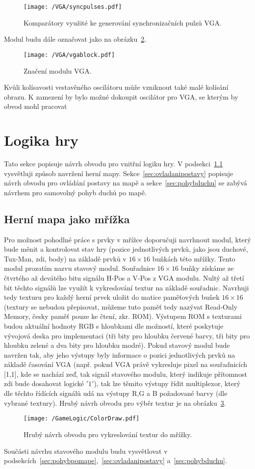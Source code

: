 \documentclass{report}
\begin{document}
\begin{figure}
\centering
\texttt{[image: /VGA/syncpulses.pdf]}
\caption{Komparátory využité ke generování synchronizačních pulzů VGA.}
\label{fig:syncpulses}
\end{figure}
Modul budu dále označovat jako na obrázku~\ref{fig:vgablock}.
\begin{figure}
\centering
\texttt{[image: /VGA/vgablock.pdf]}
\caption{Značení modulu VGA.}
\label{fig:vgablock}
\end{figure}
\par Kvůli kolísavosti vestavěného oscilátoru může vzniknout také malé kolísání obrazu. K zamezení by bylo možné dokoupit oscilátor pro VGA, se kterým by obvod mohl pracovat
\section{Logika hry}\label{sec:logikahry}
Tato sekce popisuje návrh obvodu pro vnitřní logiku hry. V podsekci~\ref{sec:mapajakomrizka} vysvětluji způsob navržení herní mapy. Sekce~\ref{sec:ovladanipostavy} popisuje návrh obvodu pro ovládání postavy na mapě a  sekce~\ref{sec:pohybduchu} se zabývá návrhem pro samovolný pohyb duchů po mapě.
\subsection{Herní mapa jako mřížka}\label{sec:mapajakomrizka}
Pro možnost pohodlné práce s prvky v mřížce doporučuji navrhnout modul, který bude měnit a kontrolovat stav hry (pozice jednotlivých prvků, jako jsou duchové, Tux-Man, zdi, body) na základě prvků v $16×16$ buňkách této mřížky. Tento modul prozatím nazvu stavový modul. Souřadnice $16×16$ buňky získáme ze čtvrtého až devátého bitu signálu H-Pos a V-Pos z VGA modulu. Nultý až třetí bit těchto signálů lze využít k vykreslování textur na základě souřadnic. Navrhuji tedy texturu pro každý herní prvek uložit do matice paměťových buňek $16×16$ (textury se nebudou přepisovat, můžeme tuto paměť tedy nazývat Read-Only Memory, česky paměť pouze ke čtení, zkr. ROM). Výstupem ROM s texturami budou aktuální hodnoty RGB s hloubkami dle možností, které poskytuje vývojová deska pro implementaci (tři bity pro hloubku červené barvy, tři bity pro hloubku zelené a dva bity pro hloubku modré). Pokud stavový modul bude navržen tak, aby jeho výstupy byly informace o pozici jednotlivých prvků na základě časování VGA (např. pokud VGA právě vykresluje pixel na souřadnicích [1,1], kde se nachází zeď, tak signál stavového modulu, který indikuje přítomnost zdi bude dosahovat logické $'1'$), tak lze těmito výstupy řídit multiplexor, který dle těchto řídících signálů udá na výstupy R,G a B požadované barvy (dle vybrané textury). Hrubý návrh obvodu pro výběr textur je na obrázku~\ref{fig:colorselect}.
\begin{figure}
\centering
\texttt{[image: /GameLogic/ColorDraw.pdf]}
\caption{Hrubý návrh obvodu pro vykreslování textur do mřížky.}
\label{fig:colorselect}
\end{figure}
Součásti návrhu stavového modulu budu vysvětlovat v podsekcích~\ref{sec:pohybpomape},~\ref{sec:ovladanipostavy} a~\ref{sec:pohybduchu}.
\end{document}
